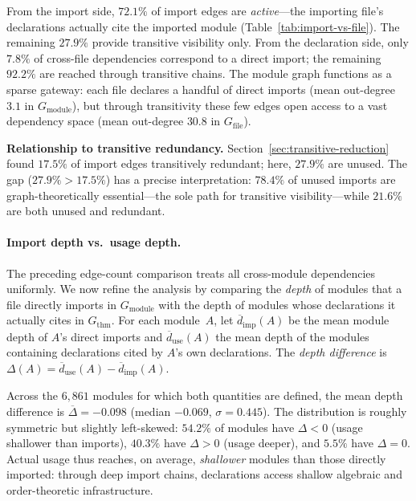 From the import side, $72.1\%$ of import edges are \emph{active}---the importing file's declarations actually cite the imported module (Table~\ref{tab:import-vs-file}). The remaining $27.9\%$ provide transitive visibility only. From the declaration side, only $7.8\%$ of cross-file dependencies correspond to a direct import; the remaining $92.2\%$ are reached through transitive chains. The module graph functions as a sparse gateway: each file declares a handful of direct imports (mean out-degree $3.1$ in $G_{\mathrm{module}}$), but through transitivity these few edges open access to a vast dependency space (mean out-degree $30.8$ in $G_{\mathrm{file}}$).

\noindent\textbf{Relationship to transitive redundancy.}
\label{rem:unused-vs-redundant}
Section~\ref{sec:transitive-reduction} found $17.5\%$ of import edges transitively redundant; here, $27.9\%$ are unused. The gap ($27.9\% > 17.5\%$) has a precise interpretation: $78.4\%$ of unused imports are graph-theoretically essential---the sole path for transitive visibility---while $21.6\%$ are both unused and redundant.

\paragraph{Import depth vs.\ usage depth.}

The preceding edge-count comparison treats all cross-module dependencies uniformly. We now refine the analysis by comparing the \emph{depth} of modules that a file directly imports in $G_{\mathrm{module}}$ with the depth of modules whose declarations it actually cites in $G_{\mathrm{thm}}$. For each module~$A$, let $\overline{d}_{\mathrm{imp}}(A)$ be the mean module depth of $A$'s direct imports and $\overline{d}_{\mathrm{use}}(A)$ the mean depth of the modules containing declarations cited by $A$'s own declarations. The \emph{depth difference} is $\Delta(A) = \overline{d}_{\mathrm{use}}(A) - \overline{d}_{\mathrm{imp}}(A)$.

Across the $6{,}861$ modules for which both quantities are defined, the mean depth difference is $\overline{\Delta} = -0.098$ (median $-0.069$, $\sigma = 0.445$). The distribution is roughly symmetric but slightly left-skewed: $54.2\%$ of modules have $\Delta < 0$ (usage shallower than imports), $40.3\%$ have $\Delta > 0$ (usage deeper), and $5.5\%$ have $\Delta = 0$. Actual usage thus reaches, on average, \emph{shallower} modules than those directly imported: through deep import chains, declarations access shallow algebraic and order-theoretic infrastructure.

